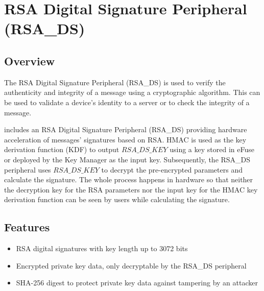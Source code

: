 \documentclass[main\_\_EN.tex]{subfiles}
\begin{document}

\ifglobal
\else
    {\let\clearpage\relax \listoftodos}
    {\let\clearpage\relax \listofdonetodos}
    \tableofcontents
\fi



\chapter{RSA Digital Signature Peripheral (RSA\_DS)}
\label{mod:digsig}
\hypertarget{digsig}{}\hypertarget{rsads}{}

\section{Overview}

The RSA Digital Signature Peripheral (RSA\_DS) is used to verify the authenticity and integrity of a message using a cryptographic algorithm. This can be used to validate a device's identity to a server or to check the integrity of a message.

\chipname{} includes an RSA Digital Signature Peripheral (RSA\_DS) providing hardware acceleration of messages' signatures based on RSA. HMAC is used as the key derivation function (KDF) to output \begin{math}RSA\_DS\_KEY\end{math} using a key stored in eFuse or deployed by the Key Manager as the input key. Subsequently, the RSA\_DS peripheral uses \begin{math}RSA\_DS\_KEY\end{math} to decrypt the pre-encrypted parameters and calculate the signature. The whole process happens in hardware so that neither the decryption key for the RSA parameters nor the input key for the HMAC key derivation function can be seen by users while calculating the signature.

\section{Features}

\begin{itemize}
\item RSA digital signatures with key length up to 3072 bits
\item Encrypted private key data, only decryptable by the RSA\_DS peripheral
\item SHA-256 digest to protect private key data against tampering by an attacker
\end{itemize}
\end{document}
